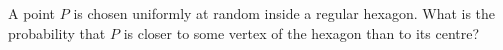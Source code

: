 A point $P$ is chosen uniformly at random inside a regular hexagon. What is the probability that $P$ is closer to some vertex of the hexagon than to its centre?
